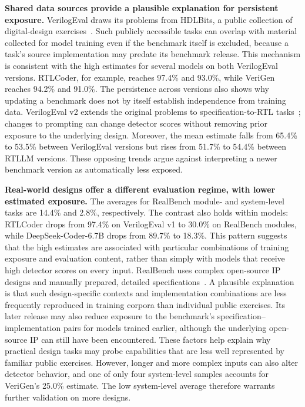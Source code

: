 \textbf{Shared data sources provide a plausible explanation for persistent exposure.}
VerilogEval draws its problems from HDLBits, a public collection of digital-design exercises~\cite{liu2023verilogeval}. Such publicly accessible tasks can overlap with material collected for model training even if the benchmark itself is excluded, because a task's source implementation may predate its benchmark release. This mechanism is consistent with the high estimates for several models on both VerilogEval versions. RTLCoder, for example, reaches 97.4\% and 93.0\%, while VeriGen reaches 94.2\% and 91.0\%. The persistence across versions also shows why updating a benchmark does not by itself establish independence from training data. VerilogEval v2 extends the original problems to specification-to-RTL tasks~\cite{pinckney2024revisitingverilogeval}; changes to prompting can change detector scores without removing prior exposure to the underlying design. Moreover, the mean estimate falls from 65.4\% to 53.5\% between VerilogEval versions but rises from 51.7\% to 54.4\% between RTLLM versions. These opposing trends argue against interpreting a newer benchmark version as automatically less exposed.

\textbf{Real-world designs offer a different evaluation regime, with lower estimated exposure.}
The averages for RealBench module- and system-level tasks are 14.4\% and 2.8\%, respectively. The contrast also holds within models: RTLCoder drops from 97.4\% on VerilogEval v1 to 30.0\% on RealBench modules, while DeepSeek-Coder-6.7B drops from 89.7\% to 18.3\%. This pattern suggests that the high estimates are associated with particular combinations of training exposure and evaluation content, rather than simply with models that receive high detector scores on every input. RealBench uses complex open-source IP designs and manually prepared, detailed specifications~\cite{jin2025realbench}. A plausible explanation is that such design-specific contexts and implementation combinations are less frequently reproduced in training corpora than individual public exercises. Its later release may also reduce exposure to the benchmark's specification--implementation pairs for models trained earlier, although the underlying open-source IP can still have been encountered. These factors help explain why practical design tasks may probe capabilities that are less well represented by familiar public exercises. However, longer and more complex inputs can also alter detector behavior, and one of only four system-level samples accounts for VeriGen's 25.0\% estimate. The low system-level average therefore warrants further validation on more designs.

